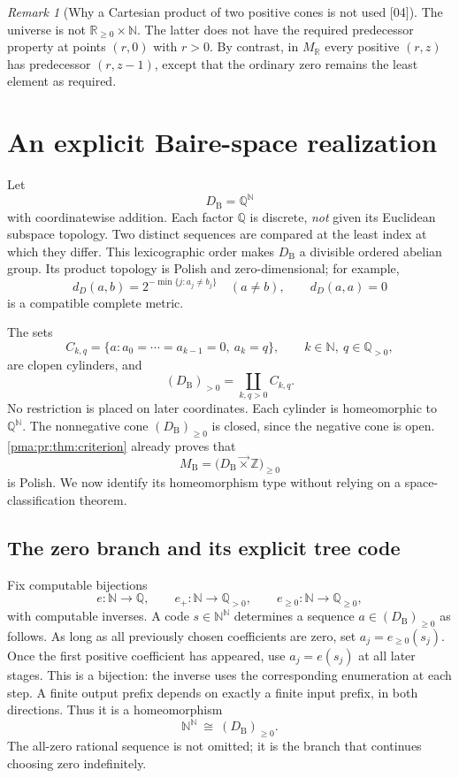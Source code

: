 \documentclass[11pt]{article}
\numberwithin{equation}{section}
\theoremstyle{definition}
\theoremstyle{remark}
\newtheorem{remark}[remark]{Remark}
\newcommand{\N}{\mathbb N}
\newcommand{\Z}{\mathbb Z}
\newcommand{\Q}{\mathbb Q}
\newcommand{\R}{\mathbb R}
\newcommand{\Baire}{\N^{\N}}
\newcommand{\lex}{\mathbin{\overrightarrow\times}}
\newcommand{\MR}{M_{\R}}
\newcommand{\MB}{M_{\mathrm B}}
\newcommand{\src}[1]{\textup{\textsf{\small[#1]}}}
\begin{document}
\begin{remark}[Why a Cartesian product of two positive cones is not used \src{04}]
The universe is not $\R_{\geq0}\times\N$. The latter does not have the
required predecessor property at points $(r,0)$ with $r>0$. By contrast,
in $\MR$ every positive $(r,z)$ has predecessor $(r,z-1)$, except that the
ordinary zero remains the least element as required.
\end{remark}

\section{An explicit Baire-space realization}
\label{pma:pr:sec:baire}

Let
\[
 D_{\mathrm B}=\Q^{\N}
\]
with coordinatewise addition. Each factor $\Q$ is discrete, \emph{not}
given its Euclidean subspace topology. Two distinct sequences are compared
at the least index at which they differ. This lexicographic order makes
$D_{\mathrm B}$ a divisible ordered abelian group. Its product topology is
Polish and zero-dimensional; for example,
\[
 d_D(a,b)=2^{-\min\{j:a_j\neq b_j\}}
 \quad(a\neq b),\qquad d_D(a,a)=0
\]
is a compatible complete metric.

The sets
\[
 C_{k,q}=\{a:a_0=\cdots=a_{k-1}=0,\ a_k=q\},
 \qquad k\in\N,\ q\in\Q_{>0},
\]
are clopen cylinders, and
\begin{equation}
 (D_{\mathrm B})_{>0}=\coprod_{k,q>0}C_{k,q}.
 \label{pma:pr:eq:positivecylinders}
\end{equation}
No restriction is placed on later coordinates. Each cylinder is
homeomorphic to $\Q^{\N}$. The nonnegative cone
$(D_{\mathrm B})_{\geq0}$ is closed, since the negative cone is open.
\cref{pma:pr:thm:criterion} already proves that
\[
 \MB=\bigl(D_{\mathrm B}\lex\Z\bigr)_{\geq0}
\]
is Polish. We now identify its homeomorphism type without relying on a
space-classification theorem.

\subsection{The zero branch and its explicit tree code}

Fix computable bijections
\[
 e:\N\to\Q,\qquad e_+:\N\to\Q_{>0},\qquad
 e_{\geq0}:\N\to\Q_{\geq0},
\]
with computable inverses. A code $s\in\Baire$ determines a sequence
$a\in(D_{\mathrm B})_{\geq0}$ as follows. As long as all previously
chosen coefficients are zero, set $a_j=e_{\geq0}(s_j)$. Once the first
positive coefficient has appeared, use $a_j=e(s_j)$ at all later stages.
This is a bijection: the inverse uses the corresponding enumeration at
each step. A finite output prefix depends on exactly a finite input
prefix, in both directions. Thus it is a homeomorphism
\begin{equation}
 \Baire\ \cong\ (D_{\mathrm B})_{\geq0}.
 \label{pma:pr:eq:zerobranch}
\end{equation}
The all-zero rational sequence is not omitted; it is the branch that
continues choosing zero indefinitely.
\end{document}
